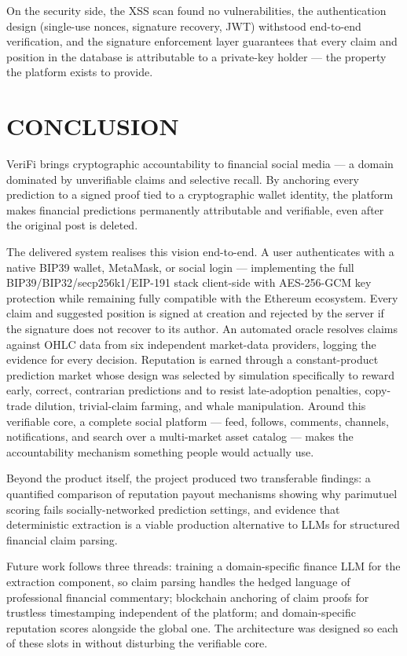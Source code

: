 \documentclass[a4paper,12pt]{report}
\begin{document}
On the security side, the XSS scan found no vulnerabilities, the authentication design (single-use nonces, signature recovery, JWT) withstood end-to-end verification, and the signature enforcement layer guarantees that every claim and position in the database is attributable to a private-key holder --- the property the platform exists to provide.

\chapter{CONCLUSION}

VeriFi brings cryptographic accountability to financial social media --- a domain dominated by unverifiable claims and selective recall. By anchoring every prediction to a signed proof tied to a cryptographic wallet identity, the platform makes financial predictions permanently attributable and verifiable, even after the original post is deleted.

\begin{sloppypar}
The delivered system realises this vision end-to-end. A user authenticates with a native BIP39 wallet, MetaMask, or social login --- implementing the full BIP39/BIP32/secp256k1/EIP-191 stack client-side with AES-256-GCM key protection while remaining fully compatible with the Ethereum ecosystem. Every claim and suggested position is signed at creation and rejected by the server if the signature does not recover to its author. An automated oracle resolves claims against OHLC data from six independent market-data providers, logging the evidence for every decision. Reputation is earned through a constant-product prediction market whose design was selected by simulation specifically to reward early, correct, contrarian predictions and to resist late-adoption penalties, copy-trade dilution, trivial-claim farming, and whale manipulation. Around this verifiable core, a complete social platform --- feed, follows, comments, channels, notifications, and search over a multi-market asset catalog --- makes the accountability mechanism something people would actually use.
\end{sloppypar}

Beyond the product itself, the project produced two transferable findings: a quantified comparison of reputation payout mechanisms showing why parimutuel scoring fails socially-networked prediction settings, and evidence that deterministic extraction is a viable production alternative to LLMs for structured financial claim parsing.

Future work follows three threads: training a domain-specific finance LLM for the extraction component, so claim parsing handles the hedged language of professional financial commentary; blockchain anchoring of claim proofs for trustless timestamping independent of the platform; and domain-specific reputation scores alongside the global one. The architecture was designed so each of these slots in without disturbing the verifiable core.



\end{document}
